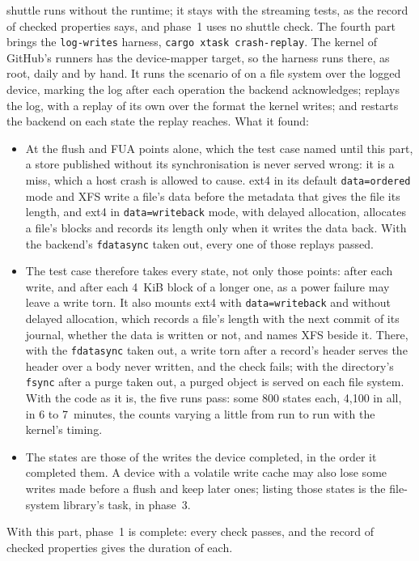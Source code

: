 shuttle runs without the runtime; it stays with the streaming tests, as
the record of checked properties says, and phase~1 uses no shuttle check.
The fourth part brings the \texttt{log-writes} harness,
\texttt{cargo xtask crash-replay}. The kernel of GitHub's runners has the
device-mapper target, so the harness runs there, as root, daily and by
hand. It runs the scenario of  on a file
system over the logged device, marking the log after each operation the
backend acknowledges; replays the log, with a replay of its own over the
format the kernel writes; and restarts the backend on each state the replay
reaches. What it found:
\begin{itemize}
  \item At the flush and FUA points alone, which the test case named until
    this part, a store published without its synchronisation is never
    served wrong: it is a miss, which a host crash is allowed to cause. ext4 in its default
    \texttt{data=ordered} mode and XFS write a file's data before the
    metadata that gives the file its length, and ext4 in
    \texttt{data=writeback} mode, with delayed allocation, allocates a
    file's blocks and records its length only when it writes the data back.
    With the backend's \texttt{fdatasync} taken out, every one of those
    replays passed.
  \item The test case therefore takes every state, not only those points:
    after each write, and after each 4~KiB block of a longer one, as a power
    failure may leave a write torn. It also mounts ext4 with
    \texttt{data=writeback} and without delayed allocation, which records a
    file's length with the next commit of its journal, whether the data is
    written or not, and names XFS beside it. There, with the \texttt{fdatasync} taken out, a write
    torn after a record's header serves the header over a body never
    written, and the check fails; with the directory's \texttt{fsync} after
    a purge taken out, a purged object is served on each file system. With
    the code as it is, the five runs pass: some 800 states each, 4,100 in
    all, in 6 to 7~minutes, the counts varying a little from run to run with
    the kernel's timing.
  \item The states are those of the writes the device completed, in the
    order it completed them. A device with a volatile write cache may also
    lose some writes made before a flush and keep later ones; listing those
    states is the file-system library's task, in phase~3.
\end{itemize}
With this part, phase~1 is complete: every check passes, and the record of
checked properties gives the duration of each.

